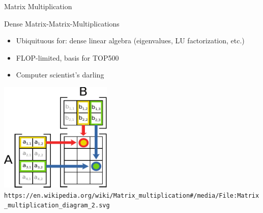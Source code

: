 






\begin{frame}[fragile]{Matrix Multiplication}

  \begin{block}{Dense Matrix-Matrix-Multiplications}
  \begin{itemize}
   \item Ubiquituous for: dense linear algebra (eigenvalues, LU factorization, etc.)
   \item FLOP-limited, basis for TOP500
   \item Computer scientist's darling
  \end{itemize}
 \end{block}


 \begin{center}
   \includegraphics[width=0.4\textwidth]{figures/gemm_diagram_2} \\
 \tiny \verb|https://en.wikipedia.org/wiki/Matrix_multiplication#/media/File:Matrix_multiplication_diagram_2.svg|
 \end{center}

\end{frame}



